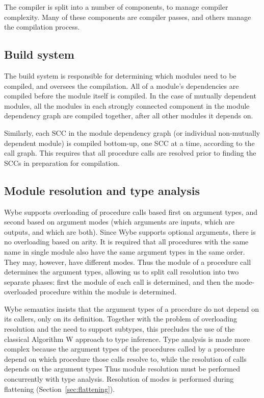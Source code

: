 \documentclass{article}
\newcommand{\lang}{\textsf{Wybe}\xspace}
\newcommand{\Lang}{\textsf{Wybe}\xspace}
\begin{document}
The compiler is split into a number of components, to manage compiler
complexity.
Many of these components are compiler passes, and others manage the
compilation process.

\subsection{Build system}
\label{sec:build}

The build system is responsible for determining which modules need to be
compiled, and oversees the compilation.
All of a module's dependencies are compiled before the module itself
is compiled.
In the case of mutually dependent modules, all the modules in each
strongly connected component in the module dependency graph are compiled
together, after all other modules it depends on.

Similarly, each SCC in the module dependency graph
(or individual non-mutually dependent module)
is compiled bottom-up, one SCC at a time, according
to the call graph.
This requires that all procedure calls are resolved prior to finding
the SCCs in preparation for compilation.


\subsection{Module resolution and type analysis}
\label{sec:call-resolution}

\Lang supports overloading of procedure calls based first on argument types,
and second based on argument modes (which arguments are inputs, which are
outputs, and which are both).
Since \lang supports optional arguments, there is no overloading based
on arity.
It is required that all procedures with the same name in single module
also have the same argument types in the same order.
They may, however, have different modes.
Thus the module of a procedure call determines the argument types, allowing
us to split call resolution into two separate phases:
first the module of each call is determined, and then the mode-overloaded
procedure within the module is determined.

Wybe semantics insists that the argument types of a procedure do not depend
on its callers, only on its definition.
Together with the problem of overloading resolution and the need to
support subtypes, this precludes the use of
the classical Algorithm W approach to type inference.
Type analysis is made more complex because
the argument types of the procedures called by a procedure
depend on which procedure those calls resolve to, while the resolution
of calls depends on the argument types
Thus module resolution must be performed concurrently with type analysis.
Resolution of modes is performed during flattening
(Section~\ref{sec:flattening}).
\end{document}
